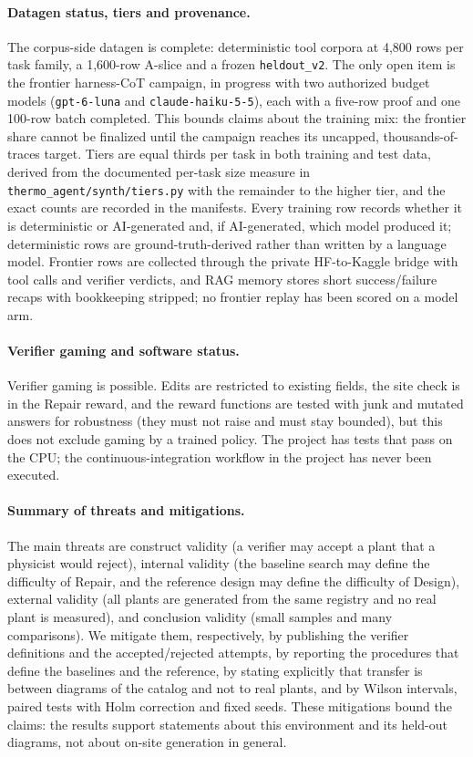 \paragraph{Datagen status, tiers and provenance.}
The corpus-side datagen is complete: deterministic tool corpora at 4,800 rows per task family, a 1,600-row A-slice and a frozen \texttt{heldout\_v2}. The only open item is the frontier harness-CoT campaign, in progress with two authorized budget models (\texttt{gpt-6-luna} and \texttt{claude-haiku-5-5}), each with a five-row proof and one 100-row batch completed. This bounds claims about the training mix: the frontier share cannot be finalized until the campaign reaches its uncapped, thousands-of-traces target. Tiers are equal thirds per task in both training and test data, derived from the documented per-task size measure in \texttt{thermo\_agent/synth/tiers.py} with the remainder to the higher tier, and the exact counts are recorded in the manifests. Every training row records whether it is deterministic or AI-generated and, if AI-generated, which model produced it; deterministic rows are ground-truth-derived rather than written by a language model. Frontier rows are collected through the private HF-to-Kaggle bridge with tool calls and verifier verdicts, and RAG memory stores short success/failure recaps with bookkeeping stripped; no frontier replay has been scored on a model arm.

\paragraph{Verifier gaming and software status.}
Verifier gaming is possible. Edits are restricted to existing fields, the site check is in the Repair reward, and the reward functions are tested with junk and mutated answers for robustness (they must not raise and must stay bounded), but this does not exclude gaming by a trained policy. The project has  tests that pass on the CPU; the continuous-integration workflow in the project has never been executed.

\paragraph{Summary of threats and mitigations.}
The main threats are construct validity (a verifier may accept a plant that a physicist would reject), internal validity (the baseline search may define the difficulty of Repair, and the reference design may define the difficulty of Design), external validity (all plants are generated from the same registry and no real plant is measured), and conclusion validity (small samples and many comparisons). We mitigate them, respectively, by publishing the verifier definitions and the accepted/rejected attempts, by reporting the procedures that define the baselines and the reference, by stating explicitly that transfer is between diagrams of the catalog and not to real plants, and by Wilson intervals, paired tests with Holm correction and fixed seeds. These mitigations bound the claims: the results support statements about this environment and its held-out diagrams, not about on-site generation in general.
